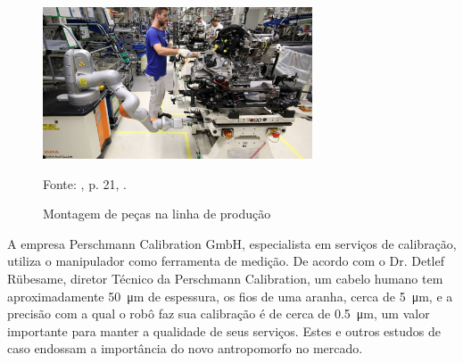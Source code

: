 \begin{figure}[h]
    \centering
    \includegraphics[width=8cm]{Imagem/VW.jpg}
    \caption{Montagem de peças na linha de produção}
    \label{fig:VW}
    \begin{flushleft}
    Fonte: \citeauthor{KUKAmanual}, p. 21, \citeyear{KUKAmanual}.
    \end{flushleft}
\end{figure}

A empresa  Perschmann Calibration GmbH, especialista em serviços de calibração, utiliza o manipulador como ferramenta de medição.  De acordo com o Dr. Detlef Rübesame, diretor Técnico da Perschmann Calibration, um cabelo humano tem aproximadamente \SI{50}{\micro\metre} de espessura, os fios de uma aranha, cerca de \SI{5}{\micro\metre}, e a precisão com a qual o robô faz sua calibração é de cerca de \SI{0,5}{\micro\metre}, um valor importante para manter a qualidade de seus serviços. Estes e outros estudos de caso endossam a importância do novo antropomorfo no mercado.
